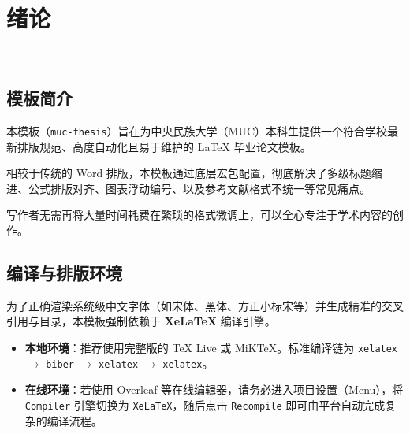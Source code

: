 \chapter{绪\hspace{1em}论}



\


\section{模板简介}
本模板（\texttt{muc-thesis}）旨在为中央民族大学（MUC）本科生提供一个符合学校最新排版规范、高度自动化且易于维护的 \LaTeX{} 毕业论文模板。

相较于传统的 Word 排版，本模板通过底层宏包配置，彻底解决了多级标题缩进、公式排版对齐、图表浮动编号、以及参考文献格式不统一等常见痛点。

写作者无需再将大量时间耗费在繁琐的格式微调上，可以全心专注于学术内容的创作。

\section{编译与排版环境}
为了正确渲染系统级中文字体（如宋体、黑体、方正小标宋等）并生成精准的交叉引用与目录，本模板强制依赖于 \textbf{XeLaTeX} 编译引擎。
\begin{itemize}
    \item \textbf{本地环境}：推荐使用完整版的 TeX Live 或 MiKTeX。标准编译链为 \texttt{xelatex} $\to$ \texttt{biber} $\to$ \texttt{xelatex} $\to$ \texttt{xelatex}。
    \item \textbf{在线环境}：若使用 Overleaf 等在线编辑器，请务必进入项目设置（Menu），将 \texttt{Compiler} 引擎切换为 \texttt{XeLaTeX}，随后点击 \texttt{Recompile} 即可由平台自动完成复杂的编译流程。
\end{itemize}

